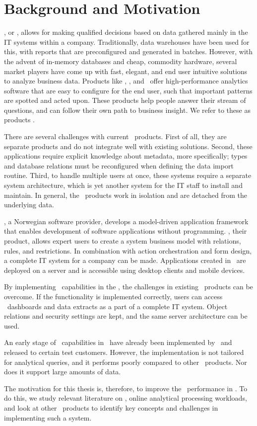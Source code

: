 \section{Background and Motivation}
\label{sec:Background and Motivation}

\bi, or \ba, allows for making qualified decisions based on data gathered mainly in the IT systems within a company. Traditionally, data warehouses have been used for this, with reports that are preconfigured and generated in batches. However, with the advent of in-memory databases and cheap, commodity hardware, several market players have come up with fast, elegant, and end user intuitive solutions to analyze business data. Products like \qlikview, \tableau, and \powerpivot~offer high-performance analytics software that are easy to configure for the end user, such that important patterns are spotted and acted upon. These products help people answer their stream of questions, and can follow their own path to business insight. We refer to these as  products \cite{Qlik2014-vd}.

There are several challenges with current \bd~products. First of all, they are separate products and do not integrate well with existing solutions. Second, these applications require explicit knowledge about metadata, more specifically; types and database relations must be reconfigured when defining the data import routine.  Third, to handle multiple users at once, these systems require a separate system architecture, which is yet another system for the IT staff to install and maintain. In general, the \bd~products work in isolation and are detached from the underlying data.

\genus, a Norwegian software provider, develops a model-driven application framework that enables development of software applications without programming. \genusSoftware, their product, allows expert users to create a system business model with relations, rules, and restrictions. In combination with action orchestration and form design, a complete IT system for a company can be made. Applications created in \genusSoftware~are deployed on a server and is accessible using desktop clients and mobile devices.

By implementing \bd~capabilities in the \genusSoftware, the challenges in existing \bd~products can be overcome. If the functionality is implemented correctly, users can access \bd~dashboards and data extracts as a part of a complete IT system. Object relations and security settings are kept, and the same server architecture can be used. 

An early stage of \bd~capabilities in \genusSoftware~have already been implemented by \genus~and released to certain test customers. However, the implementation is not tailored for analytical queries, and it performs poorly compared to other \bd~products. Nor does it support large amounts of data. 

The motivation for this thesis is, therefore, to improve the \bd~performance in \genusSoftware. To do this, we study relevant literature on \bi, online analytical processing workloads, and look at other \bd~products to identify key concepts and challenges in implementing such a system. 
